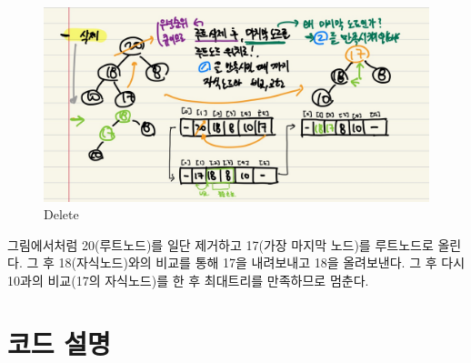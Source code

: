 \documentclass[a4paper,11pt]{article}
\begin{document}
\begin{figure}[h]
\begin{center}
\includegraphics[width=\textwidth]{delete}
\caption{Delete}
\label{fig:fig3}
\end{center}
\end{figure}

그림에서처럼 20(루트노드)를 일단 제거하고 17(가장 마지막 노드)를 루트노드로 올린다. 그 후 18(자식노드)와의 비교를 통해 17을 내려보내고 18을 올려보낸다. 그 후 다시 10과의 비교(17의 자식노드)를 한 후 최대트리를 만족하므로 멈춘다.

\section{코드 설명}
\end{document}
